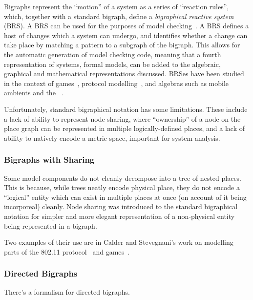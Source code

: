 Bigraphs represent the ``motion'' of a system as a series of ``reaction rules'',
which, together with a standard bigraph, define a \emph{bigraphical reactive
  system} (BRS). A BRS can be used for the purposes of model
checking~\cite{sevegnani2015bigraphs,perrone2012model}. A BRS defines a host of
changes which a system can undergo, and identifies whether a change can take
place by matching a pattern to a subgraph of the bigraph. This allows for the
automatic generation of model checking code, meaning that a fourth
representation of systems, formal models, can be added to the algebraic,
graphical and mathematical representations discussed. BRSes have been studied in
the context of games~\cite{benford2016lions}, protocol
modelling~\cite{calder2014modelling}, and algebras such as mobile
ambients and the \picalculus{}~\cite{milner2001bigraphical}.
\par

Unfortunately, standard bigraphical notation has some limitations. These include
a lack of ability to represent node sharing, where ``ownership'' of a node on
the place graph can be represented in multiple logically-defined places, and a
lack of ability to natively encode a metric space, important for system analysis.
\par

\subsubsection{Bigraphs with Sharing}

Some model components do not cleanly decompose into a tree of nested places.
This is because, while trees neatly encode physical place, they do not encode a
``logical'' entity which can exist in multiple places at once (on account of it
being incorporeal) cleanly. Node sharing was introduced to the standard
bigraphical notation for simpler and more elegant representation of a
non-physical entity being represented in a bigraph. 
\par

Two examples of their use are in Calder and Stevegnani's work on modelling parts
of the 802.11 protocol~\cite{calder2014modelling} and
games~\cite{benford2016lions}. 

\subsubsection{Directed Bigraphs}
\label{sec:review-directed-bigraphs}

There's a formalism for directed bigraphs. 

